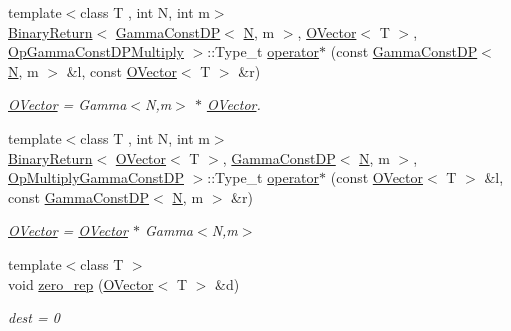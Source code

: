 \begin{DoxyCompactItemize}
{\footnotesize template$<$class T , int N, int m$>$ }\\\mbox{\hyperlink{structENSEM_1_1BinaryReturn}{Binary\+Return}}$<$ \mbox{\hyperlink{classENSEM_1_1GammaConstDP}{Gamma\+Const\+DP}}$<$ \mbox{\hyperlink{operator__name__util_8cc_a7722c8ecbb62d99aee7ce68b1752f337}{N}}, m $>$, \mbox{\hyperlink{classENSEM_1_1OVector}{O\+Vector}}$<$ T $>$, \mbox{\hyperlink{structENSEM_1_1OpGammaConstDPMultiply}{Op\+Gamma\+Const\+D\+P\+Multiply}} $>$\+::Type\+\_\+t \mbox{\hyperlink{group__obsvector_gaa96dcdea35ea89a0405ab2273dfaa9a9}{operator$\ast$}} (const \mbox{\hyperlink{classENSEM_1_1GammaConstDP}{Gamma\+Const\+DP}}$<$ \mbox{\hyperlink{operator__name__util_8cc_a7722c8ecbb62d99aee7ce68b1752f337}{N}}, m $>$ \&l, const \mbox{\hyperlink{classENSEM_1_1OVector}{O\+Vector}}$<$ T $>$ \&r)
\begin{DoxyCompactList}\small\item\em \mbox{\hyperlink{classENSEM_1_1OVector}{O\+Vector}} = Gamma$<$\+N,m$>$ $\ast$ \mbox{\hyperlink{classENSEM_1_1OVector}{O\+Vector}}. \end{DoxyCompactList}\item 
{\footnotesize template$<$class T , int N, int m$>$ }\\\mbox{\hyperlink{structENSEM_1_1BinaryReturn}{Binary\+Return}}$<$ \mbox{\hyperlink{classENSEM_1_1OVector}{O\+Vector}}$<$ T $>$, \mbox{\hyperlink{classENSEM_1_1GammaConstDP}{Gamma\+Const\+DP}}$<$ \mbox{\hyperlink{operator__name__util_8cc_a7722c8ecbb62d99aee7ce68b1752f337}{N}}, m $>$, \mbox{\hyperlink{structENSEM_1_1OpMultiplyGammaConstDP}{Op\+Multiply\+Gamma\+Const\+DP}} $>$\+::Type\+\_\+t \mbox{\hyperlink{group__obsvector_ga5641b8f1bc373f5f46ec47d9b0640c64}{operator$\ast$}} (const \mbox{\hyperlink{classENSEM_1_1OVector}{O\+Vector}}$<$ T $>$ \&l, const \mbox{\hyperlink{classENSEM_1_1GammaConstDP}{Gamma\+Const\+DP}}$<$ \mbox{\hyperlink{operator__name__util_8cc_a7722c8ecbb62d99aee7ce68b1752f337}{N}}, m $>$ \&r)
\begin{DoxyCompactList}\small\item\em \mbox{\hyperlink{classENSEM_1_1OVector}{O\+Vector}} = \mbox{\hyperlink{classENSEM_1_1OVector}{O\+Vector}} $\ast$ Gamma$<$\+N,m$>$ \end{DoxyCompactList}\item 
{\footnotesize template$<$class T $>$ }\\void \mbox{\hyperlink{group__obsvector_gab00fc89904c43c79298da792136d5b8d}{zero\+\_\+rep}} (\mbox{\hyperlink{classENSEM_1_1OVector}{O\+Vector}}$<$ T $>$ \&d)
\begin{DoxyCompactList}\small\item\em dest = 0 \end{DoxyCompactList}\item 

\end{DoxyCompactItemize}
